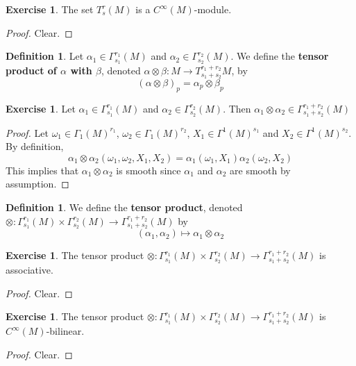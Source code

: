 \documentclass{book}
\theoremstyle{definition}
\newtheorem{defn}[definition]{Definition}
\newtheorem{ex}[definition]{Exercise}
\newcommand{\al}{\alpha}
\newcommand{\be}{\beta}
\newcommand{\om}{\omega}
\newcommand{\Gam}{\Gamma}
\DeclareMathOperator*{\0}{\mbf{0}}
\DeclareMathOperator*{\1}{\mbf{1}}
\newcommand{\tbf}[1]{\textbf{#1}}
\begin{document}
	\begin{ex}
	The set $T^r_s(M)$ is a $C^{\infty}(M)$-module.
	\end{ex}
	
	\begin{proof}
	Clear.
	\end{proof}
	
	\begin{defn}
	Let $\al_1 \in \Gam^{r_1}_{s_1}(M)$ and $\al_2 \in \Gam^{r_2}_{s_2}(M)$. We define the \tbf{tensor product of $\al$ with $\be$}, denoted $\al \otimes \be : M \rightarrow T^{r_1 + r_2}_{s_1 + s_2}M$, by $$(\al \otimes \be)_p = \al_p \otimes \be_p$$
	\end{defn}
	
	\begin{ex}
	Let $\al_1 \in \Gam^{r_1}_{s_1}(M)$ and $\al_2 \in \Gam^{r_2}_{s_2}(M)$. Then $\al_1 \otimes \al_2 \in \Gam^{r_1 + r_2}_{s_1 + s_2}(M)$
	\end{ex}
	
	\begin{proof}
	Let $\om_1 \in \Gam_1(M)^{r_1}$, $\om_2 \in \Gam_1(M)^{r_2}$, $X_1 \in \Gam^1(M)^{s_1}$ and $X_2 \in \Gam^1(M)^{s_2}$. By definition,
	$$\al_1 \otimes \al_2 (\om_1, \om_2, X_1, X_2) = \al_1(\om_1, X_1) \al_2(\om_2, X_2)$$
	This implies that $\al_1 \otimes \al_2$ is smooth since $\al_1$ and $\al_2$ are smooth by assumption.
	\end{proof}
	
	\begin{defn}
	We define the \tbf{tensor product}, denoted $\otimes : \Gam^{r_1}_{s_1}(M) \times \Gam^{r_2}_{s_2}(M) \rightarrow \Gam^{r_1+r_2}_{s_1+s_2}(M)$ by $$(\al_1, \al_2) \mapsto \al_1 \otimes \al_2 $$
	\end{defn}	
	
	\begin{ex}
	The tensor product $\otimes : \Gam^{r_1}_{s_1}(M) \times \Gam^{r_2}_{s_2}(M) \rightarrow \Gam^{r_1+r_2}_{s_1+s_2}(M)$ is associative.
	\end{ex}
	
	\begin{proof}
	Clear.
	\end{proof}
	
	\begin{ex}
	The tensor product $\otimes : \Gam^{r_1}_{s_1}(M) \times \Gam^{r_2}_{s_2}(M) \rightarrow \Gam^{r_1+r_2}_{s_1+s_2}(M)$ is $C^{\infty}(M)$-bilinear.
	\end{ex}
	
	\begin{proof}
	Clear.
	\end{proof}
	
\end{document}
